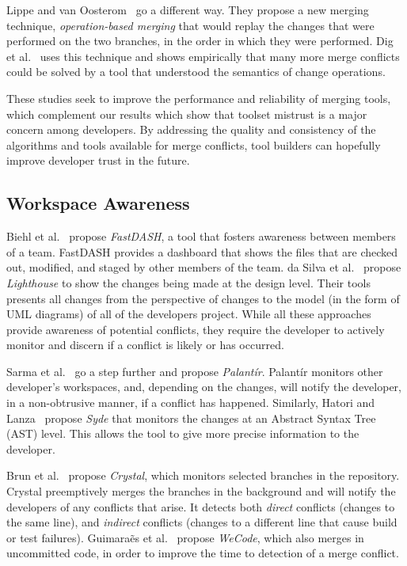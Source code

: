 Lippe and van Oosterom~\cite{lippe_operation-based_1992} go a different way.
They propose a new merging technique, \emph{operation-based merging} that would replay the changes that were performed on the two branches, in the order in which they were performed.
Dig et al.~\cite{danny2008tse} uses this technique and shows empirically that many more merge conflicts could be solved by a tool that understood the semantics of change operations.

These studies seek to improve the performance and reliability of merging tools, which complement our results which show that toolset mistrust is a major concern among developers.
By addressing the quality and consistency of the algorithms and tools available for merge conflicts, tool builders can hopefully improve developer trust in the future.

\subsection{Workspace Awareness} 

Biehl et al.~\cite{biehl_fastdash:_2007} propose \emph{FastDASH}, a tool that fosters awareness between members of a team. 
FastDASH provides a dashboard that shows the files that are checked out, modified, and staged by other members of the team.
da Silva et al.~\cite{da_silva_lighthouse:_2006} propose \emph{Lighthouse} to show the changes being made at the design level.
Their tools presents all changes from the perspective of changes to the model (in the form of UML diagrams) of all of the developers project.
While all these approaches provide awareness of potential conflicts, they require the developer to actively monitor and discern if a conflict is likely or has occurred.

Sarma et al.~\cite{palantir, sarma_palantir:_2003} go a step further and propose \emph{Palant\'{i}r}.
Palant\'{i}r monitors other developer's workspaces, and, depending on the changes, will notify the developer, in a non-obtrusive manner, if a conflict has happened.
Similarly, Hatori and Lanza~\cite{hattori2010syde} propose \emph{Syde} that monitors the changes at an Abstract Syntax Tree (AST) level.
This allows the tool to give more precise information to the developer.

Brun et al.~\cite{Brun2011} propose \emph{Crystal}, which monitors selected branches in the repository. 
Crystal preemptively merges the branches in the background and will notify the developers of any conflicts that arise. 
It detects both \emph{direct} conflicts (changes to the same line), and \emph{indirect} conflicts (changes to a different line that cause build or test failures).
Guimara\~{e}s et al.~\cite{Guimaraes} propose \emph{WeCode}, which also merges in uncommitted code, in order to improve the time to detection of a merge conflict.

